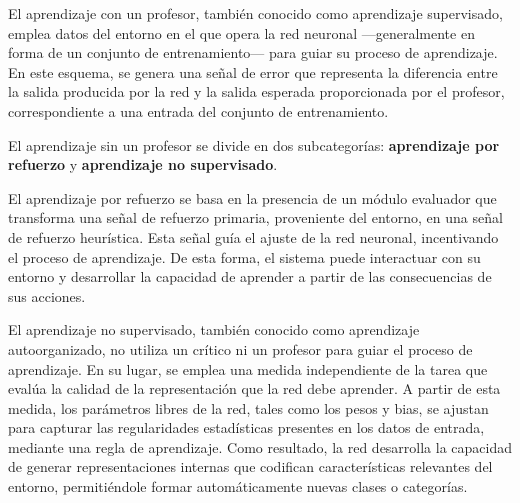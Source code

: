 El aprendizaje con un profesor, también conocido como aprendizaje supervisado, emplea datos del entorno en el que opera la red neuronal —generalmente en forma de un conjunto de entrenamiento— para guiar su proceso de aprendizaje. En este esquema, se genera una señal de error que representa la diferencia entre la salida producida por la red y la salida esperada proporcionada por el profesor, correspondiente a una entrada del conjunto de entrenamiento.
 
El aprendizaje sin un profesor se divide en dos subcategorías: \textbf{aprendizaje por refuerzo} y \textbf{aprendizaje no supervisado}.

El aprendizaje por refuerzo se basa en la presencia de un módulo evaluador que transforma una señal de refuerzo primaria, proveniente del entorno, en una señal de refuerzo heurística. Esta señal guía el ajuste de la red neuronal, incentivando el proceso de aprendizaje. De esta forma, el sistema puede interactuar con su entorno y desarrollar la capacidad de aprender a partir de las consecuencias de sus acciones.

El aprendizaje no supervisado, también conocido como aprendizaje autoorganizado, no utiliza un crítico ni un profesor para guiar el proceso de aprendizaje. En su lugar, se emplea una medida independiente de la tarea que evalúa la calidad de la representación que la red debe aprender. A partir de esta medida, los parámetros libres de la red, tales como los pesos y bias, se ajustan para capturar las regularidades estadísticas presentes en los datos de entrada, mediante una regla de aprendizaje.  Como resultado, la red desarrolla la capacidad de generar representaciones internas que codifican características relevantes del entorno, permitiéndole formar automáticamente nuevas clases o categorías.

